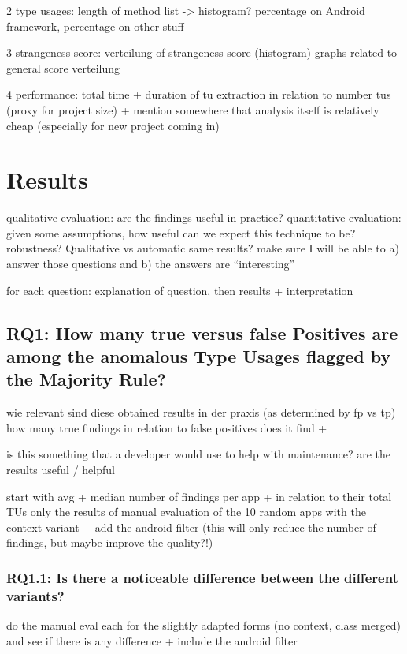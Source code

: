 2 type usages:
    length of method list -> histogram?
    percentage on Android framework, percentage on other stuff

3 strangeness score:
    verteilung of strangeness score (histogram)
    graphs related to general score verteilung

4 performance:
    total time +
    duration of tu extraction in relation to number tus (proxy for project size)
    + mention somewhere that analysis itself is relatively cheap (especially for new project coming in)

\section{Results}

qualitative evaluation: are the findings useful in practice?
quantitative evaluation: given some assumptions, how useful can we expect this technique to be? robustness? Qualitative vs automatic same results?
make sure I will be able to a) answer those questions and b) the answers are ``interesting''

for each question: explanation of question, then results + interpretation

\subsection{RQ1: How many true versus false Positives are among the anomalous Type Usages flagged by the Majority Rule?}

wie relevant sind diese obtained results in der praxis (as determined by fp vs tp)
how many true findings in relation to false positives does it find + 

is this something that a developer would use to help with maintenance?
are the results useful / helpful

start with avg + median number of findings per app + in relation to their total TUs
only the results of manual evaluation of the 10 random apps with the context variant
+ add the android filter (this will only reduce the number of findings, but maybe improve the quality?!)

\subsubsection{RQ1.1: Is there a noticeable difference between the different variants?}

do the manual eval each for the slightly adapted forms (no context, class merged) and see if there is any difference
+ include the android filter


